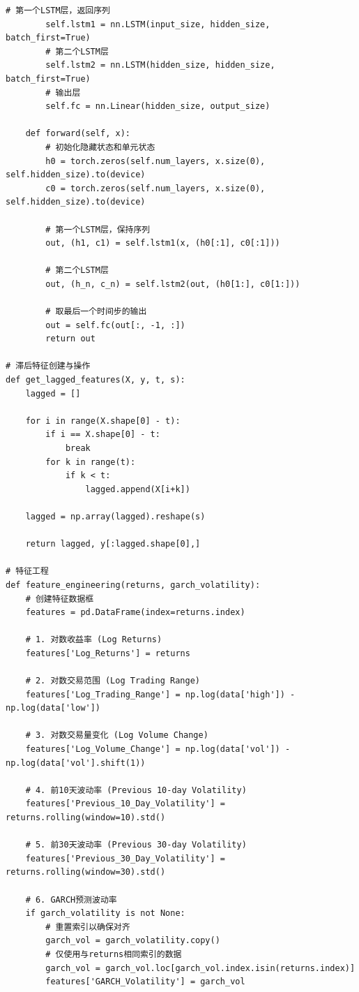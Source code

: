 \documentclass[12pt, a4paper]{article}
\begin{document}
\begin{lstlisting}[basicstyle=\small\ttfamily, breaklines=true, columns=fullflexible]
        # 第一个LSTM层，返回序列
        self.lstm1 = nn.LSTM(input_size, hidden_size, batch_first=True)
        # 第二个LSTM层
        self.lstm2 = nn.LSTM(hidden_size, hidden_size, batch_first=True)
        # 输出层
        self.fc = nn.Linear(hidden_size, output_size)
        
    def forward(self, x):
        # 初始化隐藏状态和单元状态
        h0 = torch.zeros(self.num_layers, x.size(0), self.hidden_size).to(device)
        c0 = torch.zeros(self.num_layers, x.size(0), self.hidden_size).to(device)
        
        # 第一个LSTM层，保持序列
        out, (h1, c1) = self.lstm1(x, (h0[:1], c0[:1]))
        
        # 第二个LSTM层
        out, (h_n, c_n) = self.lstm2(out, (h0[1:], c0[1:]))
        
        # 取最后一个时间步的输出
        out = self.fc(out[:, -1, :])
        return out

# 滞后特征创建与操作
def get_lagged_features(X, y, t, s):
    lagged = []
    
    for i in range(X.shape[0] - t):
        if i == X.shape[0] - t:
            break
        for k in range(t):
            if k < t:
                lagged.append(X[i+k])
                
    lagged = np.array(lagged).reshape(s)
    
    return lagged, y[:lagged.shape[0],]

# 特征工程
def feature_engineering(returns, garch_volatility):
    # 创建特征数据框
    features = pd.DataFrame(index=returns.index)
    
    # 1. 对数收益率 (Log Returns)
    features['Log_Returns'] = returns
    
    # 2. 对数交易范围 (Log Trading Range)
    features['Log_Trading_Range'] = np.log(data['high']) - np.log(data['low'])
    
    # 3. 对数交易量变化 (Log Volume Change)
    features['Log_Volume_Change'] = np.log(data['vol']) - np.log(data['vol'].shift(1))
    
    # 4. 前10天波动率 (Previous 10-day Volatility)
    features['Previous_10_Day_Volatility'] = returns.rolling(window=10).std()
    
    # 5. 前30天波动率 (Previous 30-day Volatility)
    features['Previous_30_Day_Volatility'] = returns.rolling(window=30).std()
    
    # 6. GARCH预测波动率
    if garch_volatility is not None:
        # 重置索引以确保对齐
        garch_vol = garch_volatility.copy()
        # 仅使用与returns相同索引的数据
        garch_vol = garch_vol.loc[garch_vol.index.isin(returns.index)]
        features['GARCH_Volatility'] = garch_vol
    

\end{lstlisting}
\end{document}

